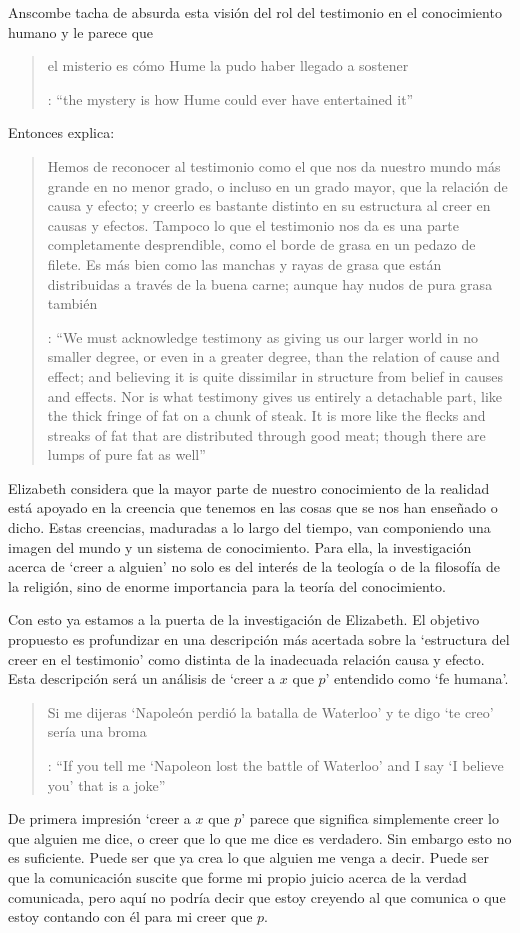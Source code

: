 Anscombe tacha de absurda esta visión del rol del testimonio en el conocimiento humano y le parece que \blockquote[{\cite[Cf.~][3]{anscombe2008faith:tobelieve}}: \enquote{the mystery is how Hume could ever have entertained it}]{el misterio es cómo Hume la pudo haber llegado a sostener}. Entonces explica: \blockquote[{\cite[3]{anscombe2008faith:tobelieve}}: \enquote{We must acknowledge testimony as giving us our larger world in no smaller degree, or even in a greater degree, than the relation of cause and effect; and believing it is quite dissimilar in structure from belief in causes and effects. Nor is what testimony gives us entirely a detachable part, like the thick fringe of fat on a chunk of steak. It is more like the flecks and streaks of fat that are distributed through good meat; though there are lumps of pure fat as well}]{Hemos de reconocer al testimonio como el que nos da nuestro mundo más grande en no menor grado, o incluso en un grado mayor, que la relación de causa y efecto; y creerlo es bastante distinto en su estructura al creer en causas y efectos. Tampoco lo que el testimonio nos da es una parte completamente desprendible, como el borde de grasa en un pedazo de filete. Es más bien como las manchas y rayas de grasa que están distribuidas a través de la buena carne; aunque hay nudos de pura grasa también} Elizabeth considera que la mayor parte de nuestro conocimiento de la realidad está apoyado en la creencia que tenemos en las cosas que se nos han enseñado o dicho. Estas creencias, maduradas a lo largo del tiempo, van componiendo una imagen del mundo y un sistema de conocimiento. Para ella, la investigación acerca de `creer a alguien' no solo es del interés de la teología o de la filosofía de la religión, sino de enorme importancia para la teoría del conocimiento.

Con esto ya estamos a la puerta de la investigación de Elizabeth. El objetivo propuesto es profundizar en una descripción más acertada sobre la `estructura del creer en el testimonio' como distinta de la inadecuada relación causa y efecto. Esta descripción será un análisis de \enquote*{creer a $x$ que $p$} entendido como `fe humana'.

\blockquote[{\cite[4]{anscombe2008faith:tobelieve}}: \enquote{If you tell me `Napoleon lost the battle of Waterloo' and I say `I believe you' that is a joke}]{Si me dijeras `Napoleón perdió la batalla de Waterloo' y te digo `te creo' sería una broma}. De primera impresión \enquote*{creer a $x$ que $p$} parece que significa simplemente creer lo que alguien me dice, o creer que lo que me dice es verdadero. Sin embargo esto no es suficiente. Puede ser que ya crea lo que alguien me venga a decir. Puede ser que la comunicación suscite que forme mi propio juicio acerca de la verdad comunicada, pero aquí no podría decir que estoy creyendo al que comunica o que estoy contando con él para mi creer que $p$.


